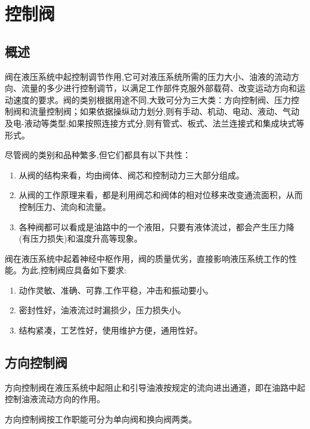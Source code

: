 
\chapter{控制阀}

\section{概述}

阀在液压系统中起控制调节作用,它可对液压系统所需的压力大小、油液的流动方向、流量的多少进行控制调节，以满足工作部件克服外部载荷、改变运动方向和运动速度的要求。阀的类别根据用途不同,大致可分为三大类：方向控制阀、压力控制阀和流量控制阀；如果依据操纵动力划分,则有手动、机动、电动、液动、气动及电-液动等类型;如果按照连接方式分,则有管式、板式、法兰连接式和集成块式等形式。

尽管阀的类别和品种繁多,但它们都具有以下共性：

\begin{enumerate}[(1)]
\item 从阀的结构来看，均由阀体、阀芯和控制动力三大部分组成。

\item 从阀的工作原理来看，都是利用阀芯和阀体的相对位移来改变通流面积，从而控制压力、流向和流量。

\item 各种阀都可以看成是油路中的一个液阻，只要有液体流过，都会产生压力降(有压力损失)和温度升高等现象。
\end{enumerate}

阀在液压系统中起着神经中枢作用，阀的质量优劣，直接影响液压系统工作的性能。为此,控制阀应具备如下要求:

\begin{enumerate}[(1)]
\item 动作灵敏、准确、可靠,工作平稳，冲击和振动要小。

\item 密封性好，油液流过时漏损少，压力损失小。

\item 结构紧凑，工艺性好，使用维护方便，通用性好。
\end{enumerate}

\section{方向控制阀}

方向控制阀在液压系统中起阻止和引导油液按规定的流向进出通道，即在油路中起控制油液流动方向的作用。

方向控制阀按工作职能可分为单向阀和换向阀两类。

